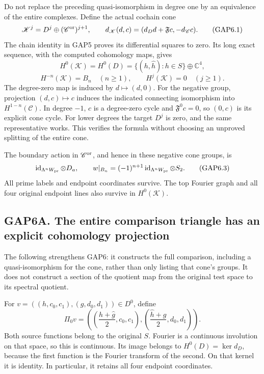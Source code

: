 Do not replace the preceding quasi-isomorphism in degree one by an
equivalence of the entire complexes. Define the actual cochain cone \[
\mathscr K^j=D^j\oplus(\mathscr C^{\rm or})^{j+1},\qquad
d_{\mathscr K}(d,c)=(d_Dd+\mathfrak F c,-d_{\mathscr C}c).
\tag{GAP6.1}
\] The chain identity in GAP5 proves its differential squares to zero.
Its long exact sequence, with the computed cohomology maps, gives \[
H^0(\mathscr K)=H^0(D)
=\{(h,\widehat h):h\in S\}\oplus\mathbb C^4,
\] \[
H^{-n}(\mathscr K)=B_n\quad(n\ge1),\qquad
H^j(\mathscr K)=0\quad(j\ge1).
\tag{GAP6.2}
\] The degree-zero map is induced by \(d\mapsto(d,0)\). For the negative
group, projection \((d,c)\mapsto c\) induces the indicated connecting
isomorphism into \(H^{1-n}(\mathscr C)\). In degree \(-1\), \(c\) is a
degree-zero cycle and \(\mathfrak F^0c=0\), so \((0,c)\) is its explicit
cone cycle. For lower degrees the target \(D^j\) is zero, and the same
representative works. This verifies the formula without choosing an
unproved splitting of the entire cone.

The boundary action in \(\mathscr C^{\rm or}\), and hence in these
negative cone groups, is \[
\operatorname{id}_{\Lambda^nW_{\rm pr}}\otimes D_a,
\qquad
w|_{B_n}=(-1)^{n+1}\operatorname{id}_{\Lambda^nW_{\rm pr}}\otimes S_2.
\tag{GAP6.3}
\] All prime labels and endpoint coordinates survive. The top Fourier
graph and all four original endpoint lines also survive in
\(H^0(\mathscr K)\).

\subsection{GAP6A. The entire comparison triangle has an explicit
cohomology
projection}\label{gap6a.-the-entire-comparison-triangle-has-an-explicit-cohomology-projection}

The following strengthens GAP6: it constructs the full comparison,
including a quasi-isomorphism for the cone, rather than only listing
that cone's groups. It does not construct a section of the quotient map
from the original test space to its spectral quotient.

For \(v=((h,c_0,c_1),(g,d_0,d_1))\in D^0\), define \[
\Pi_0v=
\left(\left(\frac{h+\widehat g}{2},c_0,c_1\right),
\left(\frac{\widehat h+g}{2},d_0,d_1\right)\right).
\tag{GAP6A.1}
\] Both source functions belong to the original \(S\). Fourier is a
continuous involution on that space, so this is continuous. Its image
belongs to \(H^0(D)=\ker d_D\), because the first function is the
Fourier transform of the second. On that kernel it is identity. In
particular, it retains all four endpoint coordinates.


